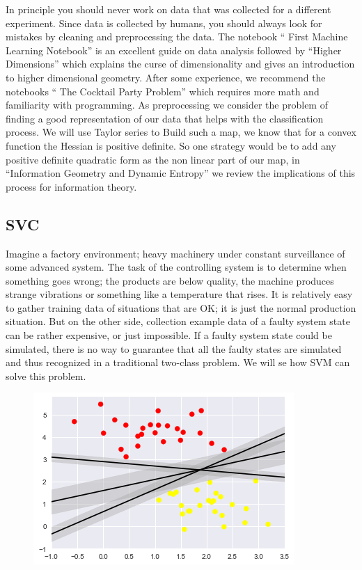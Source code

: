 \documentclass[11pt,letterpaper]{report}
\begin{document}
	  In principle you should never work on data that was collected for a different experiment. Since data is collected by humans, you should always look for mistakes by cleaning and preprocessing the data. The  notebook `` First Machine Learning Notebook'' is an excellent guide on data analysis followed by ``Higher Dimensions'' which explains the curse of dimensionality and gives an introduction to higher dimensional geometry. After some experience, we recommend  the notebooks `` The Cocktail Party Problem'' which requires more math and familiarity with programming. As preprocessing we consider the problem of finding a good representation of our data that helps with the classification process. We will use Taylor series to Build such a map, we know that for a convex function the Hessian is positive definite. So one strategy would be to add any positive definite quadratic form as the non linear part of our map, in ``Information Geometry and Dynamic Entropy'' we review the implications of this process for information theory.
 	
 	
	\subsection{SVC}
	Imagine a factory environment; heavy machinery under constant surveillance of some advanced system. The task of the controlling system is to determine when something goes wrong; the products are below quality, the machine produces strange vibrations or something like a temperature that rises. It is relatively easy to gather training data of situations that are OK; it is just the normal production situation. But on the other side, collection example data of a faulty system state can be rather expensive, or just impossible. If a faulty system state could be simulated, there is no way to guarantee that all the faulty states are simulated and thus recognized in a traditional two-class problem. We will se how SVM can solve this problem.
	
	\begin{figure}[h!]
		\centering
		\includegraphics[width=0.45\linewidth]{figures/svcl.png}
		\caption{}
		\label{fig:lines}
	\end{figure} 
	
\end{document}
